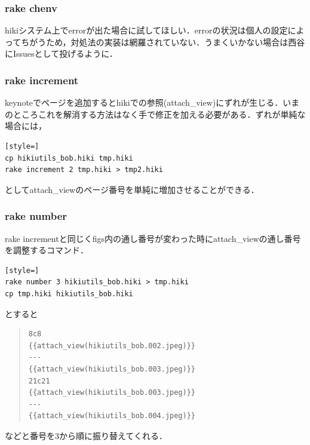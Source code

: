 \subsubsection{rake chenv}
hikiシステム上でerrorが出た場合に試してほしい．errorの状況は個人の設定によってちがうため，対処法の実装は網羅されていない．うまくいかない場合は西谷にIssuesとして投げるように．

\subsubsection{rake increment}
keynoteでページを追加するとhikiでの参照(attach\_view)にずれが生じる．いまのところこれを解消する方法はなく手で修正を加える必要がある．ずれが単純な場合には，
\begin{lstlisting}[style=]
cp hikiutils_bob.hiki tmp.hiki
rake increment 2 tmp.hiki > tmp2.hiki
\end{lstlisting}
としてattach\_viewのページ番号を単純に増加させることができる．

\subsubsection{rake number}
rake incrementと同じくfigs内の通し番号が変わった時にattach\_viewの通し番号を調整するコマンド．
\begin{lstlisting}[style=]
rake number 3 hikiutils_bob.hiki > tmp.hiki
cp tmp.hiki hikiutils_bob.hiki
\end{lstlisting}
とすると
\begin{quote}\begin{verbatim}
8c8
{{attach_view(hikiutils_bob.002.jpeg)}}
---
{{attach_view(hikiutils_bob.003.jpeg)}}
21c21
{{attach_view(hikiutils_bob.003.jpeg)}}
---
{{attach_view(hikiutils_bob.004.jpeg)}}
\end{verbatim}\end{quote}
などと番号を3から順に振り替えてくれる．


